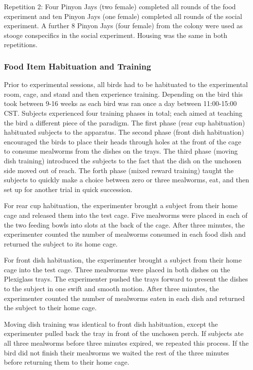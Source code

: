 \documentclass[
]{article}
\begin{document}
Repetition 2: Four Pinyon Jays (two female) completed all rounds of the
food experiment and ten Pinyon Jays (one female) completed all rounds of
the social experiment. A further 8 Pinyon Jays (four female) from the
colony were used as stooge conspecifics in the social experiment.
Housing was the same in both repetitions.

\hypertarget{food-item-habituation-and-training}{%
\subsubsection{Food Item Habituation and
Training}\label{food-item-habituation-and-training}}

Prior to experimental sessions, all birds had to be habituated to the
experimental room, cage, and stand and then experience training.
Depending on the bird this took between 9-16 weeks as each bird was ran
once a day between 11:00-15:00 CST. Subjects experienced four training
phases in total; each aimed at teaching the bird a different piece of
the paradigm. The first phase (rear cup habituation) habituated subjects
to the apparatus. The second phase (front dish habituation) encouraged
the birds to place their heads through holes at the front of the cage to
consume mealworms from the dishes on the trays. The third phase (moving
dish training) introduced the subjects to the fact that the dish on the
unchosen side moved out of reach. The forth phase (mixed reward
training) taught the subjects to quickly make a choice between zero or
three mealworms, eat, and then set up for another trial in quick
succession.

For rear cup habituation, the experimenter brought a subject from their
home cage and released them into the test cage. Five mealworms were
placed in each of the two feeding bowls into slots at the back of the
cage. After three minutes, the experimenter counted the number of
mealworms consumed in each food dish and returned the subject to its
home cage.

For front dish habituation, the experimenter brought a subject from
their home cage into the test cage. Three mealworms were placed in both
dishes on the Plexiglass trays. The experimenter pushed the trays
forward to present the dishes to the subject in one swift and smooth
motion. After three minutes, the experimenter counted the number of
mealworms eaten in each dish and returned the subject to their home
cage.

Moving dish training was identical to front dish habituation, except the
experimenter pulled back the tray in front of the unchosen perch. If
subjects ate all three mealworms before three minutes expired, we
repeated this process. If the bird did not finish their mealworms we
waited the rest of the three minutes before returning them to their home
cage.
\end{document}
